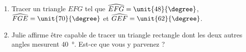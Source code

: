 
\begin{exercice}\label{exo2smath-0071}

\begin{enumerate}
    \item
    Tracer un triangle $EFG$ tel que $\widehat{EFG}=\unit{48}{\degree}$, \( \widehat{FGE}=\unit{70}{\degree}\) et \( \widehat{GEF}=\unit{62}{\degree}\).
\item
    Julie affirme être capable de tracer un triangle rectangle dont les deux autres angles mesurent \SI{40}{\degree}.  Est-ce que vous y parvenez ?
\end{enumerate}

\end{exercice}
